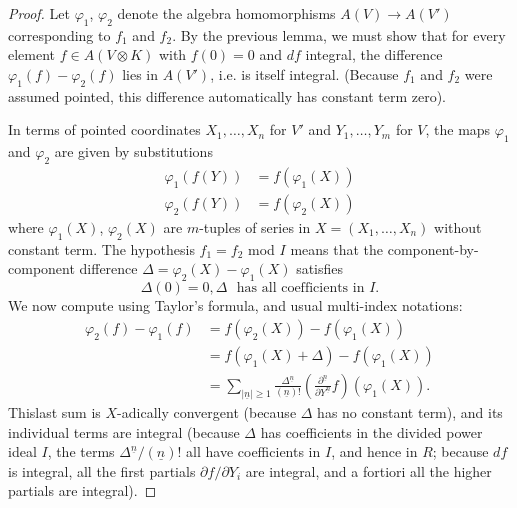 \begin{proof}
Let $\varphi_{1}$, $\varphi_{2}$ denote the algebra homomorphisms $A(V)\to A(V')$ corresponding to $f_{1}$ and $f_{2}$. By the previous lemma, we must show that for every element $f\in A(V\otimes K)$ with $f(0)=0$ and $df$ integral, the difference $\varphi_{1}(f)-\varphi_{2}(f)$ lies in $A(V')$, i.e. is itself integral. (Because $f_{1}$ and $f_{2}$ were assumed pointed, this difference automatically has constant term zero).

In terms of pointed coordinates $X_{1},\ldots,X_{n}$ for $V'$ and $Y_{1},\ldots,Y_{m}$ for $V$, the maps $\varphi_{1}$ and $\varphi_{2}$ are given by substitutions
\begin{align*}
\varphi_{1}(f(Y)) &=f(\varphi_{1}(X))\\
\varphi_{2}(f(Y)) &= f(\varphi_{2}(X))
\end{align*}
where $\varphi_{1}(X)$, $\varphi_{2}(X)$ are $m$-tuples of series in $X=(X_{1},\ldots,X_{n})$ without constant term. The hypothesis $f_{1}=f_{2}$ mod $I$ means that the component-by-component difference $\Delta=\varphi_{2}(X)-\varphi_{1}(X)$ satisfies 
$$
\Delta(0)=0, \Delta\text{~ has all coefficients in $I$}.
$$
We now compute using Taylor's formula, and usual multi-index notations:
\begin{align*}
\varphi_{2}(f) -\varphi_{1}(f) &= f(\varphi_{2}(X))-f(\varphi_{1}(X))\\
&= f(\varphi_{1}(X)+\Delta)-f(\varphi_{1}(X))\\
&=\sum\limits_{|\underline{n}|\geq 1}\frac{\Delta^{\underline{n}}}{(\underline{n})!}\left(\frac{\partial^{\underline{n}}}{\partial Y^{\underline{n}}}f\right)(\varphi_{1}(X)).
\end{align*}
This\pageoriginale last sum is $X$-adically convergent (because $\Delta$ has no constant term), and its individual terms are integral (because $\Delta$ has coefficients in the divided power ideal $I$, the terms $\Delta^{\underline{n}}/(\underline{n})!$ all have coefficients in $I$, and hence in $R$; because $df$ is integral, all the first partials $\partial f/\partial Y_{i}$ are integral, and a fortiori all the higher partials are integral).
\end{proof}

